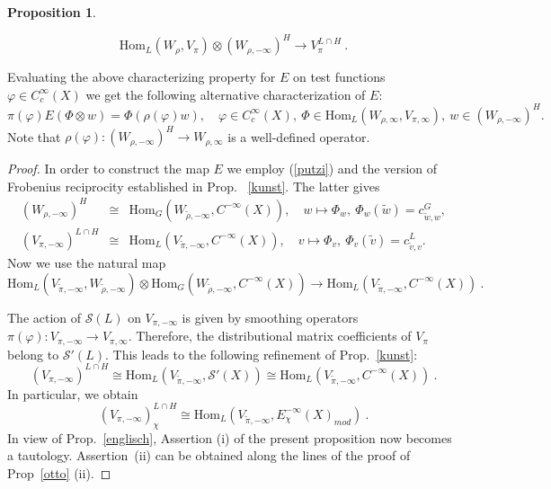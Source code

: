 \documentclass[10]{amsart}
\newtheorem{pro}[thm]{Proposition}
\theoremstyle{remark}
\theoremstyle{definition}
\numberwithin{equation}{section}
\newcommand{\Hom}{\mathrm{Hom}}
\newcommand{\vp}{\varphi}
\newcommand{\Cal}{\mathcal}
\newcommand{\be}{\begin{equation}}
\begin{document}
{\begin{pro}
\begin{itemize}
\be\label{gauguin}
\Hom_L(W_{\rho},V_{\pi})\otimes (W_{\rho,-\infty})^H\longrightarrow  V_{\pi}^{L\cap H}\ .
\end{equation}
\end{itemize}
\end{pro}
Evaluating the above characterizing property for $E$ on test functions $\vp\in C_c^\infty(X)$ we get the following alternative characterization of $E$:
\be\label{hodler} \pi(\vp)E(\Phi\otimes w)=\Phi(\rho(\vp) w),\quad \vp\in C_c^\infty(X),\  \Phi\in \Hom_L(W_{\rho,\infty},V_{\pi,\infty}), \ w\in (W_{\rho,-\infty})^H.
\end{equation}
Note that $\rho(\vp):  (W_{\rho,-\infty})^H\rightarrow W_{\rho,\infty}$ is a well-defined operator.
\begin{proof}  In order to construct the map $E$ we employ (\ref{putzi}) and the version of Frobenius reciprocity established in Prop.~ \ref{kunst}. The latter gives
\begin{eqnarray*}(W_{\rho,-\infty})^H&\cong& \Hom_G(W_{\tilde\rho,-\infty},C^{-\infty}(X)),\quad w\mapsto \Phi_w,\  \Phi_w(\tilde w)=c^G_{\tilde w,w},\\
(V_{\pi,-\infty})^{L\cap H}&\cong &\Hom_L(V_{\tilde\pi,-\infty}, C^{-\infty}(X)), \quad v\mapsto \Phi_v,\  \Phi_v(\tilde v)=c^L_{\tilde v,v}.
\end{eqnarray*}
Now we use the natural map
$$ \Hom_L(V_{\tilde\pi,-\infty},W_{\tilde\rho,-\infty})\otimes \Hom_G(W_{\tilde\rho,-\infty}, C^{-\infty}(X))\longrightarrow \Hom_L(V_{\tilde\pi,-\infty},C^{-\infty}(X))\ .$$

The action of ${\Cal S}(L)$ on $V_{\pi,-\infty}$ is given by smoothing operators $\pi(\vp): V_{\pi,-\infty}\rightarrow V_{\pi,\infty}$. Therefore, the distributional matrix coefficients
of $V_\pi$ belong to ${\Cal S}'(L)$. This leads to the following refinement of Prop.~\ref{kunst}: 
$$ (V_{\pi,-\infty})^{L\cap H}\cong \Hom_L(V_{\tilde\pi,-\infty},{\Cal S}'(X))\cong \Hom_L(V_{\tilde\pi,-\infty}, C^{-\infty}(X))\ .$$
In particular, we obtain 
$$ (V_{\pi,-\infty})^{L\cap H}_\chi \cong \Hom_L(V_{\tilde\pi,-\infty}, E^{-\infty}_\chi(X)_{mod})\ .$$
In view of Prop.~\ref{englisch}, Assertion (i) of the present proposition now becomes a tautology. Assertion~(ii) can be obtained along the lines of the proof of
Prop~\ref{otto} (ii). 


\end{proof}}
\end{document}
